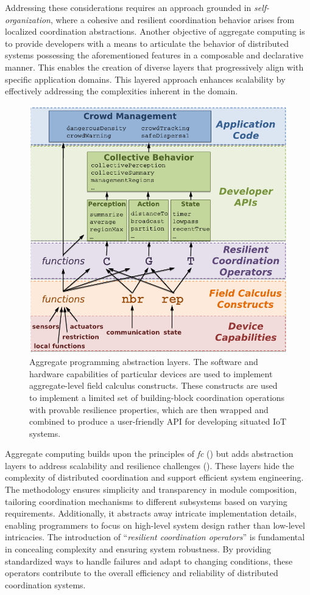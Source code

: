 Addressing these considerations requires an approach grounded in \textit{self-organization}, where a cohesive and resilient coordination behavior arises from localized coordination abstractions. Another objective of aggregate computing is to provide developers with a means to articulate the behavior of distributed systems possessing the aforementioned features in a composable and declarative manner. This enables the creation of diverse layers that progressively align with specific application domains. This layered approach enhances scalability by effectively addressing the complexities inherent in the domain.

\begin{figure}
    \centering
    \includegraphics[width=.8\linewidth]{figures/aggregate-programming-abstraction-layers.png}
    \caption{Aggregate programming abstraction layers. The software and hardware capabilities of particular devices are used to implement aggregate-level field
    calculus constructs. These constructs are used to implement a limited set of building-block coordination operations with provable resilience properties,
    which are then wrapped and combined to produce a user-friendly API for developing situated \ac{IoT} systems.}
    \label{fig:aggregate-abstraction-layers}
\end{figure}

Aggregate computing builds upon the principles of \textit{\ac{fc}} () but adds abstraction layers to address scalability and resilience challenges (). These layers hide the complexity of distributed coordination and support efficient system engineering. The methodology ensures simplicity and transparency in module composition, tailoring coordination mechanisms to different subsystems based on varying requirements. Additionally, it abstracts away intricate implementation details, enabling programmers to focus on high-level system design rather than low-level intricacies. The introduction of ``\textit{resilient coordination operators}'' is fundamental in concealing complexity and ensuring system robustness. By providing standardized ways to handle failures and adapt to changing conditions, these operators contribute to the overall efficiency and reliability of distributed coordination systems.

